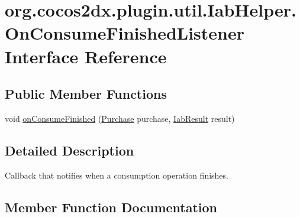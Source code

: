 \hypertarget{interfaceorg_1_1cocos2dx_1_1plugin_1_1util_1_1IabHelper_1_1OnConsumeFinishedListener}{}\section{org.\+cocos2dx.\+plugin.\+util.\+Iab\+Helper.\+On\+Consume\+Finished\+Listener Interface Reference}
\label{interfaceorg_1_1cocos2dx_1_1plugin_1_1util_1_1IabHelper_1_1OnConsumeFinishedListener}
\subsection*{Public Member Functions}
\begin{DoxyCompactItemize}
\item 
void \hyperlink{interfaceorg_1_1cocos2dx_1_1plugin_1_1util_1_1IabHelper_1_1OnConsumeFinishedListener_ad7614a77e7b88b226e70cc9d41a5f1b0}{on\+Consume\+Finished} (\hyperlink{classorg_1_1cocos2dx_1_1plugin_1_1util_1_1Purchase}{Purchase} purchase, \hyperlink{classorg_1_1cocos2dx_1_1plugin_1_1util_1_1IabResult}{Iab\+Result} result)
\end{DoxyCompactItemize}


\subsection{Detailed Description}
Callback that notifies when a consumption operation finishes. 

\subsection{Member Function Documentation}
\mbox{\label{interfaceorg_1_1cocos2dx_1_1plugin_1_1util_1_1IabHelper_1_1OnConsumeFinishedListener_ad7614a77e7b88b226e70cc9d41a5f1b0}} 
